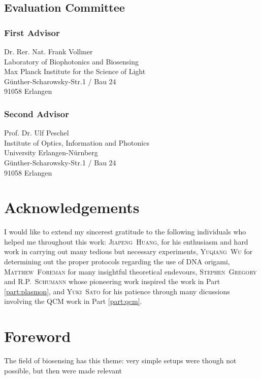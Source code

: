 \documentclass[a4paper,titlepage,onecolumn]{report}
\newcommand{\Part}[1]{Part \ref{#1}}
\begin{document}
\section*{Evaluation Committee}
\subsection*{First Advisor}
Dr. Rer. Nat. Frank Vollmer\\
Laboratory of Biophotonics and Biosensing\\
Max Planck Institute for the Science of Light\\
G\"unther-Scharowsky-Str.1 / Bau 24\\
91058 Erlangen
\subsection*{Second Advisor}
Prof. Dr. Ulf Peschel\\
Institute of Optics, Information and Photonics\\
University Erlangen-N\"urnberg\\
G\"unther-Scharowsky-Str.1 / Bau 24\\
91058 Erlangen

\newpage
\chapter*{Acknowledgements}
I would like to extend my sincerest gratitude to the following individuals
who helped me throughout this work: \textsc{Jiapeng~Huang}, for his
enthusiasm and hard work in carrying out many tedious but necessary
experiments, \textsc{Yuqiang~Wu} for determining out the proper
protocols regarding the use of DNA origami, \textsc{Matthew~Foreman}
for many insightful theoretical endevours,
\textsc{Stephen~Gregory} and \textsc{R\@.P.\@~Schumann} whose
pioneering work inspired the work in \Part{part:plasmon}, and
\textsc{Yuki~Sato} for his patience through many dicussions involving 
the QCM work in \Part{part:qcm}.

\tableofcontents

\begin{abstract}
\end{abstract}

\chapter*{Foreword}
The field of biosensing has this theme: very simple setups were though not
possible, but then were made relevant 
\end{document}
